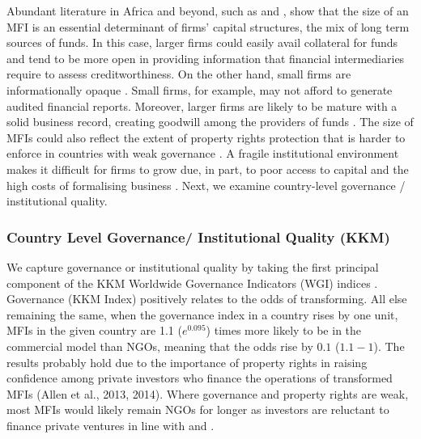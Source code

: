 \documentclass[a4paper, nobind]{templates/ociamthesis}
\begin{document}
Abundant literature in Africa and beyond, such as \textcite{gwatidzo2009corporate} and \textcite{kodongo2015capital}, show that the size of an MFI is an essential determinant of firms' capital structures, the mix of long term sources of funds. In this case, larger firms could easily avail collateral for funds and tend to be more open in providing information that financial intermediaries require to assess creditworthiness. On the other hand, small firms are informationally opaque \autocite{beck2014sme,kersten2017small}. Small firms, for example, may not afford to generate audited financial reports. Moreover, larger firms are likely to be mature with a solid business record, creating goodwill among the providers of funds \autocite{beck2008finance}. The size of MFIs could also reflect the extent of property rights protection that is harder to enforce in countries with weak governance \autocite{johnson2002property,claessens2003financial}. A fragile institutional environment makes it difficult for firms to grow due, in part, to poor access to capital and the high costs of formalising business \autocite{hansen2004reconsidering}. Next, we examine country-level governance / institutional quality.

\hypertarget{country-level-governance-institutional-quality-kkm}{%
\subsubsection{Country Level Governance/ Institutional Quality (KKM)}\label{country-level-governance-institutional-quality-kkm}}

We capture governance or institutional quality by taking the first principal component of the KKM Worldwide Governance Indicators (WGI) indices \autocite{kraay2010worldwide}. Governance (KKM Index) positively relates to the odds of transforming. All else remaining the same, when the governance index in a country rises by one unit, MFIs in the given country are 1.1 (\(e^{0.095}\)) times more likely to be in the commercial model than NGOs, meaning that the odds rise by \(0.1\) (\(1.1 - 1\)). The results probably hold due to the importance of property rights in raising confidence among private investors who finance the operations of transformed MFIs (Allen et al., 2013, 2014). Where governance and property rights are weak, most MFIs would likely remain NGOs for longer as investors are reluctant to finance private ventures in line with \textcite{johnson2002property} and \textcite{claessens2003financial}.
\end{document}
